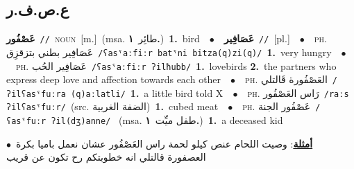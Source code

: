 \documentclass[10pt,a4paper,twoside]{article} %
\begin{document}
\begin{multicols}{2}
\vspace{-3mm}
\subsection*{\color{blue}\foreignlanguage{arabic}{ع.ص.ف.ر}\color{blue}{}} 

{\setlength\topsep{0pt}\textbf{\foreignlanguage{arabic}{عَصْفُور}}\ {\color{gray}\texttt{//}\color{black}}\ \textsc{noun}\ [m.]\ \color{gray}(msa. \foreignlanguage{arabic}{طائِر}~\foreignlanguage{arabic}{\textbf{١.}})\color{black}\ \textbf{1.}~bird\ \ $\bullet$\ \ \setlength\topsep{0pt}\textbf{\foreignlanguage{arabic}{عَصَافِير}}\ {\color{gray}\texttt{//}\color{black}}\ [pl.]\ \ $\bullet$\ \ \textsc{ph.} \color{gray} \foreignlanguage{arabic}{عَصَافِير بطني بتزقزِق}\color{black}\ {\color{gray}\texttt{/{\sffamily ʕasˤaːfiːr batˤni bitza(q)zi(q)}/}\color{black}}\ \textbf{1.}~very hungry\ \ $\bullet$\ \ \textsc{ph.} \color{gray} \foreignlanguage{arabic}{عَصَافِير الحُب}\color{black}\ {\color{gray}\texttt{/{\sffamily ʕasˤaːfiːr ʔilħubb}/}\color{black}}\ \textbf{1.}~lovebirds  \textbf{2.}~the partners who express deep love and affection towards each other\ \ $\bullet$\ \ \textsc{ph.} \color{gray} \foreignlanguage{arabic}{العَصْفُورة قَالتلي}\color{black}\ {\color{gray}\texttt{/{\sffamily ʔilʕasˤfuːra (q)aːlatli}/}\color{black}}\ \textbf{1.}~a little bird told X\ \ $\bullet$\ \ \textsc{ph.} \color{gray} \foreignlanguage{arabic}{رَاس العَصْفُور}\color{black}\ {\color{gray}\texttt{/{\sffamily raːs ʔilʕasˤfuːr}/}\color{black}}\ \color{gray}(src. \foreignlanguage{arabic}{الضفة الغربية})\color{black}\ \textbf{1.}~cubed meat\ \ $\bullet$\ \ \textsc{ph.} \color{gray} \foreignlanguage{arabic}{عَصْفُور الجنة}\color{black}\ {\color{gray}\texttt{/{\sffamily ʕasˤfuːr ʔil(dʒ)anne}/}\color{black}}\ \color{gray} (msa. \foreignlanguage{arabic}{طفل ميِّت}~\foreignlanguage{arabic}{\textbf{١.}})\color{black}\ \textbf{1.}~a deceased kid\  \begin{flushright}\color{gray}\foreignlanguage{arabic}{\textbf{\underline{\foreignlanguage{arabic}{أمثلة}}}: وصيت اللحام عنص كيلو لحمة راس العَصْفُور عشان نعمل باميا بكرة\ $\bullet$\ \  العصفورة قالتلي انه خطوبتكم رح تكون عن قريب}\end{flushright}\color{black}} \vspace{2mm}


\end{multicols}
\end{document}
